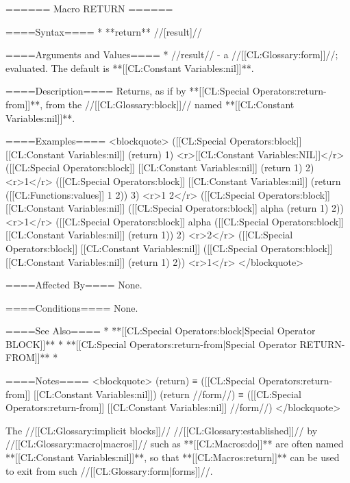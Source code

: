 ====== Macro RETURN ======

====Syntax====
  * **return** //[result]//

====Arguments and Values====
  * //result// - a //[[CL:Glossary:form]]//; evaluated. The default is **[[CL:Constant Variables:nil]]**.

====Description====
Returns, as if by **[[CL:Special Operators:return-from]]**, from the //[[CL:Glossary:block]]// named **[[CL:Constant Variables:nil]]**.

====Examples====
<blockquote>
([[CL:Special Operators:block]] [[CL:Constant Variables:nil]] (return) 1) <r>[[CL:Constant Variables:NIL]]</r>
([[CL:Special Operators:block]] [[CL:Constant Variables:nil]] (return 1) 2) <r>1</r>
([[CL:Special Operators:block]] [[CL:Constant Variables:nil]] (return ([[CL:Functions:values]] 1 2)) 3) <r>1
2</r>
([[CL:Special Operators:block]] [[CL:Constant Variables:nil]] ([[CL:Special Operators:block]] alpha (return 1) 2)) <r>1</r>
([[CL:Special Operators:block]] alpha ([[CL:Special Operators:block]] [[CL:Constant Variables:nil]] (return 1)) 2) <r>2</r>
([[CL:Special Operators:block]] [[CL:Constant Variables:nil]] ([[CL:Special Operators:block]] [[CL:Constant Variables:nil]] (return 1) 2)) <r>1</r>
</blockquote>

====Affected By====
None.

====Conditions====
None.

====See Also====
  * **[[CL:Special Operators:block|Special Operator BLOCK]]**
  * **[[CL:Special Operators:return-from|Special Operator RETURN-FROM]]**
  * {\secref\Evaluation}

====Notes====
<blockquote>
(return) ≡ ([[CL:Special Operators:return-from]] [[CL:Constant Variables:nil]]) 
(return //form//) ≡ ([[CL:Special Operators:return-from]] [[CL:Constant Variables:nil]] //form//)
</blockquote>

The //[[CL:Glossary:implicit blocks]]// //[[CL:Glossary:established]]// by //[[CL:Glossary:macro|macros]]// such as **[[CL:Macros:do]]** are often named **[[CL:Constant Variables:nil]]**, so that **[[CL:Macros:return]]** can be used to exit from such //[[CL:Glossary:form|forms]]//.

